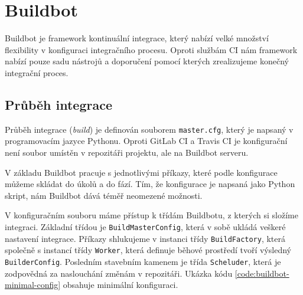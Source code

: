 \section{Buildbot}

Buildbot je framework kontinuální integrace, který nabízí velké množství flexibility v konfiguraci integračního procesu.
Oproti službám CI nám framework nabízí pouze sadu nástrojů a doporučení pomocí kterých zrealizujeme konečný integrační proces.

\subsection{Průběh integrace}

Průběh integrace (\textit{build}) je definován souborem \verb|master.cfg|, který je napsaný v programovacím jazyce Pythonu.
Oproti GitLab CI a Travis CI je konfigurační není soubor umístěn v repozitáři projektu, ale na Buildbot serveru.

V základu Buildbot pracuje s jednotlivými příkazy, které podle konfigurace můžeme skládat do úkolů a do fází.
Tím, že konfigurace je napsaná jako Python skript, nám Buildbot dává téměř neomezené možnosti.

V konfiguračním souboru máme přístup k třídám Buildbotu, z kterých si složíme integraci.
Základní třídou je \verb|BuildMasterConfig|, která v sobě ukládá veškeré nastavení integrace.
Příkazy shlukujeme v instanci třídy \verb|BuildFactory|, která společně s instancí třídy \verb|Worker|, která definuje běhové prostředí tvoří výsledný \verb|BuilderConfig|.
Posledním stavebním kamenem je třída \verb|Scheluder|, která je zodpovědná za naslouchání změnám v repozitáři.
Ukázka kódu \ref{code:buildbot-minimal-config} obsahuje minimální konfiguraci.


